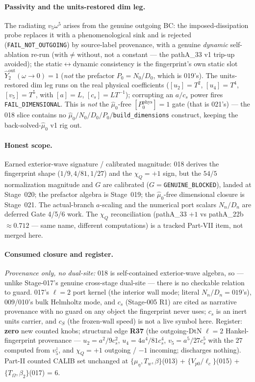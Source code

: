 \paragraph{Passivity and the units-restored dim leg.}
The radiating \(v_5\omega^5\) arises from the genuine outgoing BC: the imposed-dissipation
probe replaces it with a phenomenological sink and is rejected (\texttt{FAIL\_NOT\_OUTGOING})
by source-label provenance, with a genuine \emph{dynamic} self-ablation re-run
(\(\mathrm{with}\ne\mathrm{without}\), not a constant --- the pathA\_33 v1 trip-up avoided);
the static\(\leftrightarrow\)dynamic consistency is the fingerprint's own static slot
\(\hat Y_2^{\mathrm{out}}(\omega\to0)=1\) (\emph{not} the prefactor \(P_0=N_0/D_0\), which is
019's). The units-restored dim leg runs on the real physical coefficients
(\([u_2]=T^2\), \([u_4]=T^4\), \([v_5]=T^5\), with \([a]=L\), \([c_s]=LT^{-1}\)); corrupting
an \(a/c_s\) power fires \texttt{FAIL\_DIMENSIONAL}. This is \emph{not} the \(\hat\mu_0\)-free
\([P_0^{\mathrm{phys}}]=1\) gate (that is 021's) --- the 018 slice contains no
\(\hat\mu_0/N_0/D_0/P_0/\)\texttt{build\_dimensions} construct, keeping the back-solved-\(\hat\mu_0\)
v1 rig out.

\paragraph{Honest scope.}
Earned exterior-wave signature / calibrated magnitude: 018 derives the fingerprint shape
(\(1/9,4/81,1/27\)) and the \(\chi_Q=+1\) sign, but the \(54/5\) normalization magnitude and
\(G\) are calibrated (\(G=\)\texttt{GENUINE\_BLOCKED}), landed at Stage~020; the prefactor
algebra is Stage~019; the \(\hat\mu_0\)-free dimensional closure is Stage~021. The
actual-branch \(a\)-scaling and the numerical port scalars \(N_n/D_n\) are deferred Gate
4/5/6 work. The \(\chi_Q\) reconciliation (pathA\_33 \(+1\) vs pathA\_22b \(\approx0.712\) ---
same name, different computations) is a tracked Part-VII item, not merged here.

\paragraph{Consumed closure and register.}
\emph{Provenance only, no dual-site:} 018 is self-contained exterior-wave algebra, so ---
unlike Stage-017's genuine cross-stage dual-site --- there is no checkable relation to guard.
017's \(\ell=2\) port kernel (the interior wall mode; literal \(N_n/D_n=019\)'s), 009/010's
bulk Helmholtz mode, and \(c_s\) (Stage-005 R1) are cited as narrative provenance with no
guard on any object the fingerprint never uses; \(c_s\) is an inert units carrier, and \(c_S\)
(the frozen-wall speed) is not a live symbol here. Register: \textbf{zero} new counted knobs;
structural edge \textbf{R37} (the outgoing-DtN \(\ell=2\) Hankel-fingerprint provenance ---
\(u_2=a^2/9c_s^2\), \(u_4=4a^4/81c_s^4\), \(v_5=a^5/27c_s^5\) with the \(27\) computed from
\(v_5^z\), and \(\chi_Q=+1\) outgoing / \(-1\) incoming; discharges nothing). Part-II counted
CALIB set unchanged at \(\{\mu_\eta,T_w,\beta\}\)(013) + \(\{V_{p0}/\ell_c\}\)(015) +
\(\{T_\Omega,\beta_2\}\)(017) = 6.

